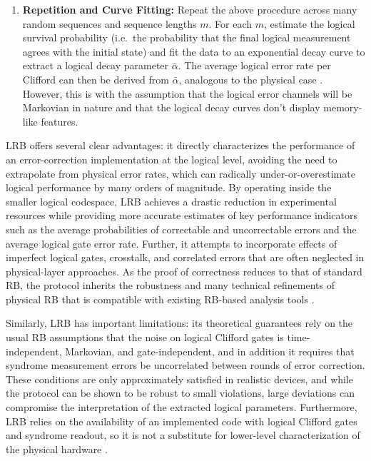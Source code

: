 \begin{enumerate}
  \item \textbf{Repetition and Curve Fitting:}
  Repeat the above procedure across many random sequences and sequence
  lengths $m$. For each $m$, estimate the logical survival probability
  (i.e.\ the probability that the final logical measurement agrees with
  the initial state) and fit the data to an exponential decay curve to
  extract a logical decay parameter $\bar{\alpha}$. The average logical error
  rate per Clifford can then be derived from $\bar{\alpha}$, analogous
  to the physical case \cite{Magesan2011PRL,Magesan2012PRA,Wallman2018}. However, this is with the assumption that the logical error channels will be Markovian in nature and that the logical decay curves don't display memory-like features.
\end{enumerate}

LRB offers several clear advantages: it directly characterizes the performance of an error-correction implementation at the logical level, avoiding the need to extrapolate from physical error rates, which can radically under-or-overestimate logical performance by many orders of magnitude. By operating inside the smaller logical codespace, LRB achieves a drastic reduction in experimental resources while providing more accurate estimates of key performance indicators such as the average probabilities of correctable and uncorrectable errors and the average logical gate error rate. Further, it attempts to incorporate effects of imperfect logical gates, crosstalk, and correlated errors that are often neglected in physical-layer approaches. As the proof of correctness reduces to that of standard RB, the protocol inherits the robustness and many technical refinements of physical RB that is compatible with existing RB-based analysis tools \cite{Combes2017}. 

Similarly, LRB has important limitations: its theoretical guarantees rely on the usual RB
assumptions that the noise on logical Clifford gates is time-independent, Markovian, and gate-independent,
and in addition it requires that syndrome measurement errors be uncorrelated between rounds of error correction. These conditions are only approximately satisfied in realistic devices, and while the protocol can be shown to be robust to small violations, large deviations can compromise the interpretation of the extracted logical parameters. Furthermore, LRB relies on the availability of an implemented code with logical
Clifford gates and syndrome readout, so it is not a substitute for lower-level characterization of the physical hardware \cite{Combes2017}.

